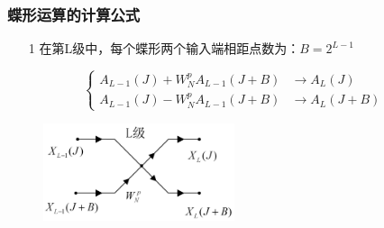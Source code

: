 \documentclass[notheorems,compress,mathserif,table]{beamer}
\begin{document}
\begin{frame}[shrink]\frametitle{蝶形运算的计算公式}%
\begin{enumerate}
  \item [1] 在第L级中，每个蝶形两个输入端相距点数为：$B=2^{L-1}$
\end{enumerate}
\begin{equation*}
\left\{ \begin{aligned}
A_{L-1}(J) + W_N^{p}A_{L-1}(J+B) &\longrightarrow A_L(J) \\
A_{L-1}(J) - W_N^{p}A_{L-1}(J+B) &\longrightarrow A_L(J+B)
\end{aligned} \right.
\end{equation*}

\begin{figure}[h]
  \centering
  \includegraphics[width=0.5\textwidth]{diexingyunsuanguilv.jpg}
\end{figure}
\end{frame}
%
%
%
\end{document}
